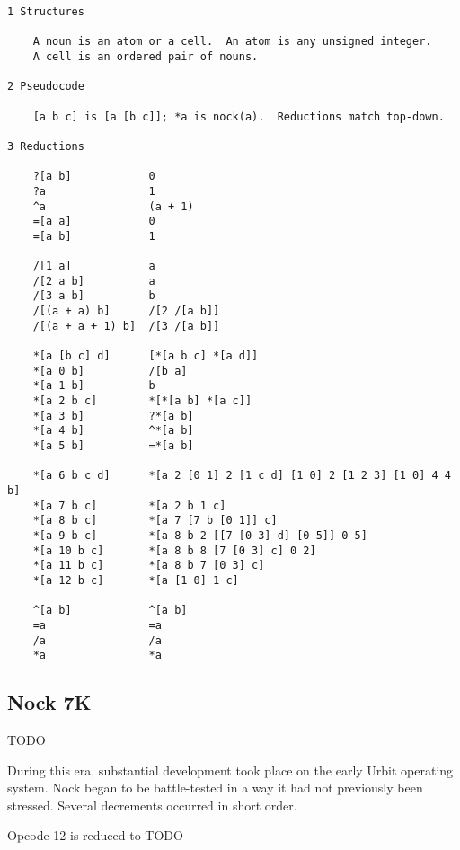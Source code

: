 \documentclass[twoside]{article}
\begin{document}
\begin{lstlisting}[label=lst:nock8k,caption={Nock 8K, 25 July 2010.},style=listingcode]
1 Structures

    A noun is an atom or a cell.  An atom is any unsigned integer.
    A cell is an ordered pair of nouns.

2 Pseudocode

    [a b c] is [a [b c]]; *a is nock(a).  Reductions match top-down.

3 Reductions

    ?[a b]            0
    ?a                1
    ^a                (a + 1)
    =[a a]            0
    =[a b]            1

    /[1 a]            a
    /[2 a b]          a
    /[3 a b]          b
    /[(a + a) b]      /[2 /[a b]]
    /[(a + a + 1) b]  /[3 /[a b]]

    *[a [b c] d]      [*[a b c] *[a d]]
    *[a 0 b]          /[b a]
    *[a 1 b]          b
    *[a 2 b c]        *[*[a b] *[a c]]
    *[a 3 b]          ?*[a b]
    *[a 4 b]          ^*[a b]
    *[a 5 b]          =*[a b]

    *[a 6 b c d]      *[a 2 [0 1] 2 [1 c d] [1 0] 2 [1 2 3] [1 0] 4 4 b]
    *[a 7 b c]        *[a 2 b 1 c]
    *[a 8 b c]        *[a 7 [7 b [0 1]] c]
    *[a 9 b c]        *[a 8 b 2 [[7 [0 3] d] [0 5]] 0 5]
    *[a 10 b c]       *[a 8 b 8 [7 [0 3] c] 0 2]
    *[a 11 b c]       *[a 8 b 7 [0 3] c]
    *[a 12 b c]       *[a [1 0] 1 c]

    ^[a b]            ^[a b]
    =a                =a
    /a                /a
    *a                *a
\end{lstlisting}

\subsection{Nock 7K}

TODO

During this era, substantial development took place on the early Urbit operating system.  Nock began to be battle-tested in a way it had not previously been stressed.  Several decrements occurred in short order.

Opcode 12 is reduced to TODO
\end{document}
